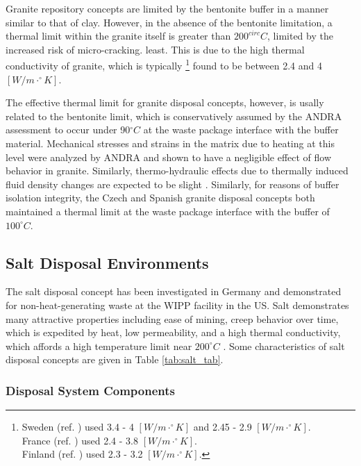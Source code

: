 Granite repository concepts are limited by the bentonite buffer in a manner 
similar to that of clay. However, in the absence of the bentonite limitation, a 
thermal limit within the granite itself is greater than $200^{circ}C$, limited 
by the increased risk of micro-cracking.
least. This is due to the high thermal conductivity of granite, which is 
typically 
\footnote{
Sweden (ref. \cite{ab_long-term_2006}) used 3.4 - 4 $[W/m\cdot^{\circ}K]$ and 2.45 - 2.9 $[W/m\cdot^{\circ}K]$.\\
France (ref. \cite{andra_argile:_2005}) used 2.4 - 3.8 $[W/m\cdot^{\circ}K]$.\\
Finland (ref. \cite{posiva_interim_2010}) used 2.3 - 3.2 $[W/m\cdot^{\circ}K]$. 
}
found to be between 2.4 and 4 $[W/m\cdot^{\circ}K]$. 

The effective thermal limit for granite disposal concepts, however, is usally 
related to the bentonite limit, which is conservatively assumed by the \gls{ANDRA} assessment to occur under 
90$^{\circ}C$ at the waste package interface with the buffer material.  
Mechanical stresses and strains in the matrix due to heating at this 
level were analyzed by \gls{ANDRA} and shown to have a negligible effect of 
flow behavior in granite. Similarly, thermo-hydraulic effects due to thermally
induced fluid density changes are expected to be slight 
\cite{andra_granit:_2005}.
Similarly, for reasons of buffer isolation integrity, the Czech and Spanish
granite disposal concepts both maintained a thermal limit at the waste package
interface with the buffer of $100^{\circ}C$.  \cite{von_lensa_red-impact_2008}

\subsection{Salt Disposal Environments}

The salt disposal concept has been investigated in Germany and demonstrated for 
non-heat-generating waste at the \gls{WIPP} facility in the US. Salt 
demonstrates many attractive properties including ease of mining, creep behavior 
over time, which is expedited by heat, low permeability, and a high thermal 
conductivity, which affords a high temperature limit near $200^{\circ}C$ 
\cite{hardin_generic_2011} .
Some characteristics of salt disposal 
concepts are given in Table \ref{tab:salt_tab}.   



\subsubsection{Disposal System Components}

